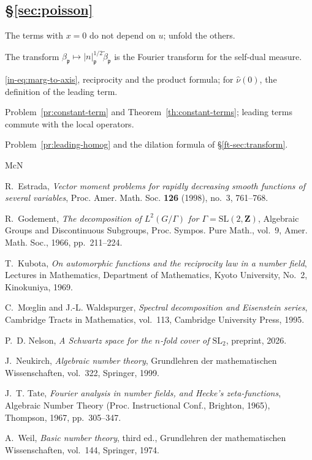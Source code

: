 \documentclass[reqno]{amsart}
\newcommand{\pp}{\mathfrak{p}}
\numberwithin{equation}{section}
\theoremstyle{definition}
\theoremstyle{plain}
\newenvironment{hints}{\begin{description}[font=\normalfont\bfseries]}{\end{description}}
\begin{document}
\subsection*{\S\ref{sec:poisson}}
\begin{hints}
\item[\ref{pr:constant-term}] The terms with $x = 0$ do not depend on $u$; unfold the others.
\item[\ref{pr:isotropy}] The transform $\beta_\pp \mapsto \lvert n \rvert_\pp^{1/2} \tilde{\beta}_\pp$ is the Fourier transform for the self-dual measure.
\item[\ref{pr:nu-values}] \eqref{in-eq:marg-to-axis}, reciprocity and the product formula; for $\hat{\nu}(0)$, the definition of the leading term.
\item[\ref{pr:translated-ct}] Problem~\ref{pr:constant-term} and Theorem~\ref{th:constant-terms}; leading terms commute with the local operators.
\item[\ref{pr:projector}] Problem~\ref{pr:leading-homog} and the dilation formula of \S\ref{ft-sec:transform}.
\end{hints}

\begin{thebibliography}{McN}

R.~Estrada, \emph{Vector moment problems for rapidly decreasing smooth functions of several variables}, Proc. Amer. Math. Soc. \textbf{126} (1998), no.~3, 761--768.

R.~Godement, \emph{The decomposition of {$L^2(G/\Gamma)$} for {$\Gamma = \mathrm{SL}(2, \mathbf{Z})$}}, Algebraic Groups and Discontinuous Subgroups, Proc. Sympos. Pure Math., vol.~9, Amer. Math. Soc., 1966, pp.~211--224.

T.~Kubota, \emph{On automorphic functions and the reciprocity law in a number field}, Lectures in Mathematics, Department of Mathematics, Kyoto University, No.~2, Kinokuniya, 1969.

C.~M{\oe}glin and J.-L. Waldspurger, \emph{Spectral decomposition and {E}isenstein series}, Cambridge Tracts in Mathematics, vol.~113, Cambridge University Press, 1995.

P.~D. Nelson, \emph{A {S}chwartz space for the $n$-fold cover of $\mathrm{SL}_2$}, preprint, 2026.

J.~Neukirch, \emph{Algebraic number theory}, Grundlehren der mathematischen Wissenschaften, vol.~322, Springer, 1999.

J.~T. Tate, \emph{Fourier analysis in number fields, and {H}ecke's zeta-functions}, Algebraic Number Theory (Proc. Instructional Conf., Brighton, 1965), Thompson, 1967, pp.~305--347.

A.~Weil, \emph{Basic number theory}, third ed., Grundlehren der mathematischen Wissenschaften, vol.~144, Springer, 1974.

\end{thebibliography}
\end{document}
